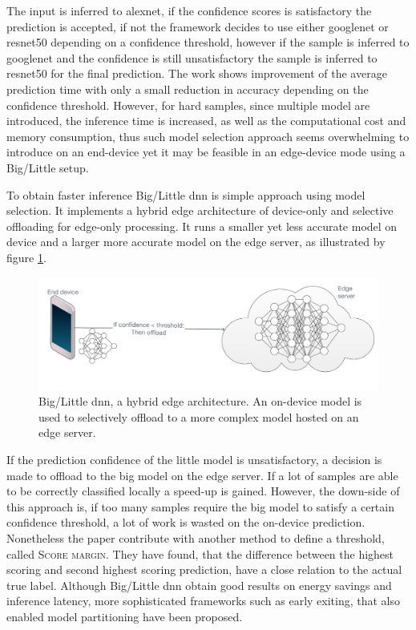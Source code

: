 The input is inferred to \gls{alexnet}, if the confidence scores is satisfactory the prediction is accepted, if not the framework decides to use either \gls{googlenet} or \gls{resnet}50 depending on a confidence threshold, however if the sample is inferred to \gls{googlenet} and the confidence is still unsatisfactory the sample is inferred to \gls{resnet}50 for the final prediction. The work shows improvement of the average prediction time with only a small reduction in accuracy depending on the confidence threshold. However, for hard samples, since multiple model are introduced, the inference time is increased, as well as the computational cost and memory consumption, thus such model selection approach seems overwhelming to introduce on an end-device yet it may be feasible in an edge-device mode using a Big/Little setup.

To obtain faster inference Big/Little \gls{dnn} \cite{park_big/little_2015} is simple approach using model selection. It implements a hybrid edge architecture of device-only and selective offloading for edge-only processing. It runs a smaller yet less accurate model on device and a larger more accurate model on the edge server, as illustrated by figure \ref{fig:big/little-dnn}. 

\begin{figure}
	\centering
	\includegraphics[width=\linewidth]{figures/models/big_little_dnn}
	\caption[Big/Little \gls{dnn} architecture]{Big/Little \gls{dnn}, a hybrid edge architecture. An on-device model is used to selectively offload to a more complex model hosted on an edge server.}
	\label{fig:big/little-dnn}
\end{figure}

If the prediction confidence of the little model is unsatisfactory, a decision is made to offload to the big model on the edge server. If a lot of samples are able to be correctly classified locally a speed-up is gained. However, the down-side of this approach is, if too many samples require the big model to satisfy a certain confidence threshold, a lot of work is wasted on the on-device prediction. Nonetheless the paper \cite{park_big/little_2015} contribute with another method to define a threshold, called \textsc{Score margin}. They have found, that the difference between the highest scoring and second highest scoring prediction, have a close relation to the actual true label. Although Big/Little \gls{dnn} obtain good results on energy savings and inference latency, more sophisticated frameworks such as early exiting, that also enabled model partitioning have been proposed.

